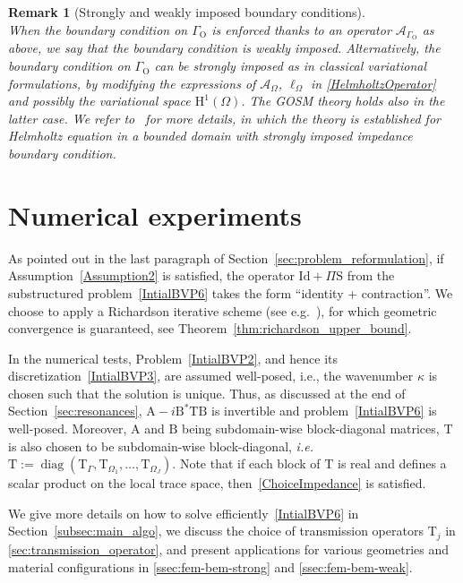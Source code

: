\documentclass[a4paper,11pt]{article}
\newcommand{\mA}{\mathrm{A}}
\newcommand{\mB}{\mathrm{B}}
\newcommand{\mH}{\mathrm{H}}
\newcommand{\Id}{\mathrm{Id}}
\newcommand{\mT}{\mathrm{T}}
\newcommand{\mS}{\mathrm{S}}
\DeclareMathOperator{\diag}{diag} %
\newtheorem{rem}[defn]{Remark}
\begin{document}
\begin{rem}[Strongly and weakly imposed boundary conditions]\label{rem:weakstrongBC}\quad\\
When the boundary condition on \({\Gamma}_{\text{O}}\) is enforced thanks to an operator \(\mathcal{A}_{\Gamma_{\text{O}}}\) as above, we say that the boundary condition is \emph{weakly} imposed.
Alternatively, the boundary condition on \(\Gamma_{\text{O}}\) can be \emph{strongly} imposed as in classical variational formulations, by modifying the expressions of \(\mathcal{A}_{\Omega}\), \(\ell_{\Omega}\) in \eqref{HelmholtzOperator} and possibly the variational space \(\mH^{1}(\Omega)\). The GOSM theory holds also in the latter case. We refer to~\cite{MR4433119} for more details, in which the theory is established for Helmholtz equation in a bounded domain with strongly imposed impedance boundary condition.
\end{rem}


\section{Numerical experiments}\label{sec:numerical_experiments}

As pointed out in the last paragraph of
Section~\ref{sec:problem_reformulation}, if Assumption~\eqref{Assumption2}
is satisfied, the operator \(\Id+\Pi\mS\) from the substructured
problem~\eqref{IntialBVP6} takes the form ``identity + contraction''. We
choose to apply a Richardson iterative scheme (see
e.g.~\cite{Hackbusch2016ISL}), for which geometric convergence is guaranteed,
see Theorem~\ref{thm:richardson_upper_bound}.

In the numerical tests, Problem~\eqref{IntialBVP2}, and hence its discretization~\eqref{IntialBVP3}, are assumed well-posed, i.e., the wavenumber \(\kappa\) is chosen such that the solution is unique. Thus, as discussed at the end of Section~\ref{sec:resonances}, \(\mA-i\mB^*\mT\mB\) is invertible and problem~\eqref{IntialBVP6} is well-posed. Moreover, \(\mA\) and \(\mB\) being subdomain-wise block-diagonal matrices, \(\mT\) is also chosen to be subdomain-wise block-diagonal, \textit{i.e.}\ \(\mT:= \diag(\mT_{\Gamma},\mT_{\Omega_1},\dots,\mT_{\Omega_J})\). Note that if each block of \(\mT\) is real and defines a scalar product on the local trace space, then~\eqref{ChoiceImpedance} is satisfied.

We give more details on how to solve efficiently~\eqref{IntialBVP6} in Section~\ref{subsec:main_algo}, we discuss the choice of transmission operators \(\mT_j\) in \cref{sec:transmission_operator}, and present applications for various geometries and material configurations in \cref{ssec:fem-bem-strong} and \cref{ssec:fem-bem-weak}.
\end{document}
